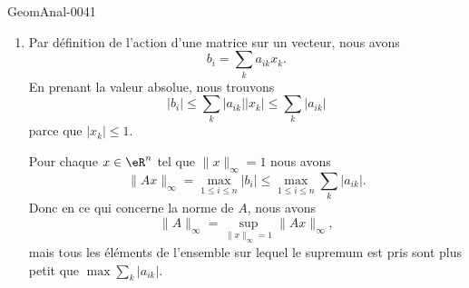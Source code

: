 \begin{corrige}{GeomAnal-0041}

    \begin{enumerate}
        \item
            Par définition de l'action d'une matrice sur un vecteur, nous avons
            \begin{equation}
                b_i=\sum_ka_{ik}x_k.
            \end{equation}
            En prenant la valeur absolue, nous trouvons
            \begin{equation}
                | b_i |\leq\sum_k| a_{ik} | |x_k |\leq\sum_k| a_{ik} |
            \end{equation}
            parce que \( | x_k |\leq 1\).

            Pour chaque \( x\in\eR^n\) tel que \( \| x \|_{\infty}=1\) nous avons
            \begin{equation}
                \| Ax \|_{\infty}=\max_{1\leq i\leq n}| b_i |\leq \max_{1\leq i\leq n}\sum_k| a_{ik} |.
            \end{equation}
            Donc en ce qui concerne la norme de \( A\), nous avons
            \begin{equation}
                \| A \|_{\infty}=\sup_{\| x \|_{\infty}=1}\| Ax \|_{\infty},
            \end{equation}
            mais tous les éléments de l'ensemble sur lequel le supremum est pris sont plus petit que \( \max\sum_k| a_{ik} |\).


\end{enumerate}
\end{corrige}

